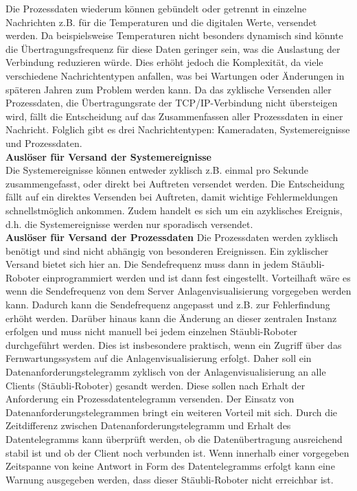 \documentclass[ a4paper,
                oneside,
                toc=bibliography,
                toc=listof
                ]{scrbook}
\begin{document}
	Die Prozessdaten wiederum können gebündelt oder getrennt in einzelne Nachrichten z.B. für die Temperaturen und die digitalen Werte, versendet werden. Da beispielsweise Temperaturen nicht besonders dynamisch sind könnte die Übertragungsfrequenz für diese Daten geringer sein, was die Auslastung der Verbindung reduzieren würde. Dies erhöht jedoch die Komplexität, da viele verschiedene Nachrichtentypen anfallen, was bei Wartungen oder Änderungen in späteren Jahren zum Problem werden kann. Da das zyklische Versenden aller Prozessdaten, die Übertragungsrate der TCP/IP-Verbindung nicht übersteigen wird, fällt die Entscheidung auf das Zusammenfassen aller Prozessdaten in einer Nachricht. Folglich gibt es drei Nachrichtentypen: Kameradaten, Systemereignisse und Prozessdaten.\\
	\textbf{Auslöser für Versand der Systemereignisse}\\
	Die Systemereignisse können entweder zyklisch z.B. einmal pro Sekunde zusammengefasst, oder direkt bei Auftreten versendet werden. Die Entscheidung fällt auf ein direktes Versenden bei Auftreten, damit wichtige Fehlermeldungen schnellstmöglich ankommen. Zudem handelt es sich um ein azyklisches Ereignis, d.h. die Systemereignisse werden nur sporadisch versendet.\\
	\textbf{Auslöser für Versand der Prozessdaten}
	Die Prozessdaten werden zyklisch benötigt und sind nicht abhängig von besonderen Ereignissen. Ein zyklischer Versand bietet sich hier an. Die Sendefrequenz muss dann in jedem Stäubli-Roboter einprogrammiert werden und ist dann fest eingestellt. Vorteilhaft wäre es wenn die Sendefrequenz von dem Server Anlagenvisualisierung vorgegeben werden kann. Dadurch kann die Sendefrequenz angepasst und z.B. zur Fehlerfindung erhöht werden. Darüber hinaus kann die Änderung an dieser zentralen Instanz erfolgen und muss nicht manuell bei jedem einzelnen Stäubli-Roboter durchgeführt werden. Dies ist insbesondere praktisch, wenn ein Zugriff über das Fernwartungssystem auf die Anlagenvisualisierung erfolgt. Daher soll ein Datenanforderungstelegramm zyklisch von der Anlagenvisualisierung an alle Clients (Stäubli-Roboter) gesandt werden. Diese sollen nach Erhalt der Anforderung ein Prozessdatentelegramm versenden. Der Einsatz von Datenanforderungstelegrammen bringt ein weiteren Vorteil mit sich. Durch die Zeitdifferenz zwischen Datenanforderungstelegramm und Erhalt des Datentelegramms kann überprüft werden, ob die Datenübertragung ausreichend stabil ist und ob der Client noch verbunden ist. Wenn innerhalb einer vorgegeben Zeitspanne von keine Antwort in Form des Datentelegramms erfolgt kann eine Warnung ausgegeben werden, dass dieser Stäubli-Roboter nicht erreichbar ist.\\
\end{document}
